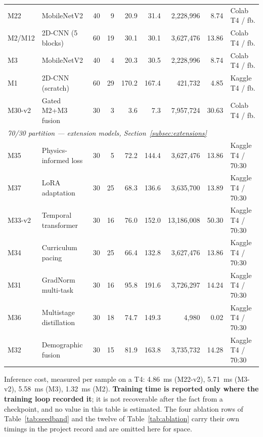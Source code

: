 \documentclass[journal,onecolumn]{IEEEtran}
\begin{document}
\begin{table}[!t]
\begin{tabular}{llrrrrrrl}
M22    & MobileNetV2       & 40 & \phantom{0}9 & 20.9 & 31.4 & 2{,}228{,}996 & \phantom{00}8.74 & Colab T4 / fb. \\
M2/M12 & 2D-CNN (5 blocks) & 60 & 19 & 30.1 & 30.1 & 3{,}627{,}476 & \phantom{0}13.86 & Colab T4 / fb. \\
M3     & MobileNetV2       & 40 & \phantom{0}4 & 20.3 & 30.5 & 2{,}228{,}996 & \phantom{00}8.74 & Colab T4 / fb. \\
M1     & 2D-CNN (scratch)  & 60 & 29 & 170.2 & 167.4 & \phantom{0}421{,}732 & \phantom{00}4.85 & Kaggle T4 / fb. \\
M30-v2 & Gated M2+M3 fusion & 30 & \phantom{0}3 & \phantom{0}3.6 & \phantom{0}7.3 & 7{,}957{,}724 & \phantom{0}30.63 & Colab T4 / fb. \\
\midrule
\multicolumn{9}{l}{\emph{70/30 partition --- extension models, Section~\ref{subsec:extensions}}}\\
M35    & Physics-informed loss & 30 & \phantom{0}5 & 72.2 & 144.4 & 3{,}627{,}476 & \phantom{0}13.86 & Kaggle T4 / 70:30 \\
M37    & LoRA adaptation       & 30 & 25 & 68.3 & 136.6 & 3{,}635{,}700 & \phantom{0}13.89 & Kaggle T4 / 70:30 \\
M33-v2 & Temporal transformer  & 30 & 16 & 76.0 & 152.0 & 13{,}186{,}008 & \phantom{0}50.30 & Kaggle T4 / 70:30 \\
M34    & Curriculum pacing     & 30 & 25 & 66.4 & 132.8 & 3{,}627{,}476 & \phantom{0}13.86 & Kaggle T4 / 70:30 \\
M31    & GradNorm multi-task   & 30 & 16 & 95.8 & 191.6 & 3{,}726{,}297 & \phantom{0}14.24 & Kaggle T4 / 70:30 \\
M36    & Multistage distillation & 30 & 18 & 74.7 & 149.3 & \phantom{00,00}4{,}980 & \phantom{00}0.02 & Kaggle T4 / 70:30 \\
M32    & Demographic fusion    & 30 & 15 & 81.9 & 163.8 & 3{,}735{,}732 & \phantom{0}14.28 & Kaggle T4 / 70:30 \\
\bottomrule
\end{tabular}

\vspace{2pt}
\footnotesize Inference cost, measured per sample on a T4: 4.86~ms (M22-v2),
5.71~ms (M3-v2), 5.58~ms (M3), 1.32~ms (M2). \textbf{Training time is reported
only where the training loop recorded it}; it is not recoverable after the fact
from a checkpoint, and no value in this table is estimated. The four ablation rows
of Table~\ref{tab:seedband} and the twelve of Table~\ref{tab:ablation} carry their
own timings in the project record and are omitted here for space.
\end{table}
\end{document}
